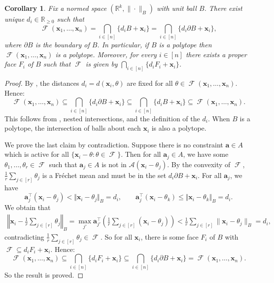 \documentclass[10pt]{article}
\newtheorem{corollary}[theorem]{Corollary}
\theoremstyle{definition}
\theoremstyle{remark}
\newcommand{\R}{\mathbb{R}}
\newcommand{\T}{\intercal}
\DeclareMathOperator{\FMset}{\mathcal{F}}
\renewcommand{\vec}[1]{\mathbf{#1}}
\newcommand{\A}{\mathcal{A}}
\begin{document}
	\begin{corollary}
		\label{cor:FMisPolytope}
		Fix a normed space $(\R^k, \| \cdot \|_B)$ with unit ball $B$. There exist unique $d_i \in \R_{\geq 0}$ such that $$\FMset (\vec x_1,\ldots,\vec x_n) = \bigcap_{i \in [n]}\{d_iB + \vec x_i\} = \bigcap_{i \in [n]}\{d_i\partial B + \vec x_i\},
		$$ where $\partial B$ is the boundary of $B$. In particular, if $B$ is a polytope then $\FMset(\vec x_1, \dots, \vec x_n)$ is a polytope. Moreover, for every $i \in [n]$ there exists a proper face $F_i$ of $B$ such that $\FMset$ is given by $\bigcap_{i \in [n]}\{d_iF_i + \vec x_i\}$. 
	\end{corollary}
	
	\begin{proof}
		By , the distances $d_i = d(\vec x_i,\theta)$ are fixed for all $\theta \in \FMset(\vec x_1, \dots, \vec x_n)$. Hence:
		\[
		\FMset(\vec x_1, \dots, \vec x_n) \subseteq \bigcap_{i \in [n]} \{d_i\partial B + \vec x_i\} \subseteq \bigcap_{i \in [n]} \{d_i B + \vec x_i\} \subseteq \FMset(\vec x_1, \dots, \vec x_n).
		\]
		This follows from , nested intersections, and the definition of the $d_i$. When $B$ is a polytope, the intersection of balls about each $\vec x_i$ is also a polytope. 
		
		We prove the last claim by contradiction. Suppose there is no constraint $\vec a \in A$ which is active for all $\{ \vec x_i - \theta: \theta \in \FMset\}$. Then for all $\vec a_j \in A$, we have some $\theta_1, \dots, \theta_r \in \FMset$ such that $\vec a_j \in A$ is not in $\A(\vec x_i - \theta_j)$. By the convexity of $\FMset$, $\tfrac{1}{r}\sum_{j \in [r]} \theta_j$ is a Fr\'echet mean and must be in the set $d_i\partial B + \vec x_i$. For all $\vec a_j$, we have
		\[
		\vec a_j^\T(\vec x_i - \theta_j) < \Vert \vec x_i - \theta_j\Vert_B = d_i, \qquad \vec a_j^\T(\vec x_i - \theta_k) \leq \Vert \vec x_i - \theta_k\Vert_B = d_i.
		\]
		We obtain that
		\begin{align*}
			\left \Vert \vec x_i - \tfrac{1}{r}\textstyle\sum_{j \in [r]} \theta_j \right \Vert_B = \textstyle\max_{j'} \vec a_{j'}^{\top} \left(\tfrac{1}{r}\sum_{j \in [r]} (\vec x_i -  \theta_j) \right) < \tfrac{1}{r}\sum_{j \in [r]} \|\vec x_i -  \theta_j\|_B = d_i,
		\end{align*}
		contradicting $\tfrac{1}{r}\sum_{j \in [r]} \theta_j \in \FMset$. So for all $\vec x_i$, there is some face $F_i$ of $B$ with $\FMset \subseteq d_i F_i + \vec x_i$. Hence:
		\[
		\FMset(\vec x_1, \dots, \vec x_n) \subseteq \bigcap_{i \in [n]} \{d_iF_i + \vec x_i\} \subseteq \bigcap_{i \in [n]} \{d_i\partial B + \vec x_i\} = \FMset(\vec x_1, \dots, \vec x_n).
		\]
		So the result is proved.
	\end{proof}
	
\end{document}
